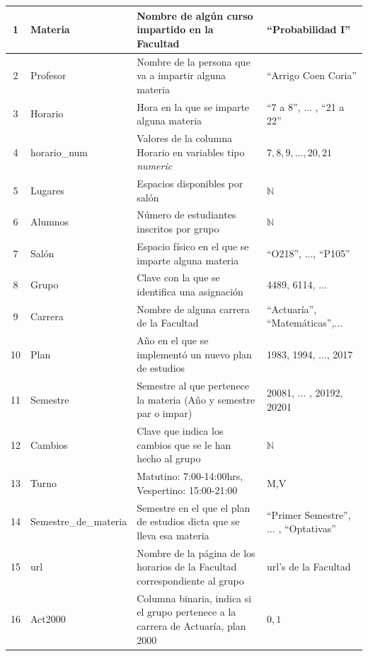 {\begin{longtable}{|c|l|p{7cm}|p{2.6cm}|}
1 & Materia & Nombre de algún curso impartido en la Facultad & ``Probabilidad I'' \\ 
\hline 
2 & Profesor & Nombre de la persona que va a impartir alguna materia & ``Arrigo Coen Coria'' \\ 
\hline 
3 & Horario & Hora en la que se imparte alguna materia & ``7 a 8'', $\ldots$ , ``21 a 22'' \\ 
\hline
4 & horario\_num & Valores de la columna Horario en variables tipo \textit{numeric} & $7,8,9,\ldots,20,21$ \\ 
\hline
5 & Lugares & Espacios disponibles por salón & $\mathbb{N}$ \\ 
\hline 
6 & Alumnos & Número de estudiantes inscritos por grupo & $\mathbb{N}$ \\ 
\hline 
7 & Salón & Espacio físico en el que se imparte alguna materia & ``O218'', ..., ``P105'' \\ 
\hline 
8 & Grupo & Clave con la que se identifica una asignación & 4489, 6114, $\ldots$ \\ 
\hline 
9 & Carrera & Nombre de alguna carrera de la Facultad & ``Actuaría'', ``Matemáticas'',... \\ 
\hline 
10 & Plan & Año en el que se implementó un nuevo plan de estudios & 1983, 1994, ..., 2017 \\ 
\hline 
11 & Semestre & Semestre al que pertenece la materia (Año y semestre par o impar) & 20081, $\ldots$ , 20192, 20201 \\ 
\hline 
12 & Cambios & Clave que indica los cambios que se le han hecho al grupo & $\mathbb{N}$ \\ 
\hline 
13 & Turno & Matutino: 7:00-14:00hrs, Vespertino: 15:00-21:00 & M,V \\ 
\hline 
14 & Semestre\_de\_materia & Semestre en el que el plan de estudios dicta que se lleva esa materia & ``Primer Semestre'', $\ldots$ , ``Optativas'' \\ 
\hline 
15 & url & Nombre de la página de los horarios de la Facultad correspondiente al grupo & url's de la Facultad \\ 
\hline 
16 & Act2000 & Columna binaria, indica si el grupo pertenece a la carrera de Actuaría, plan 2000 & $0,1$\\

\end{longtable}}
